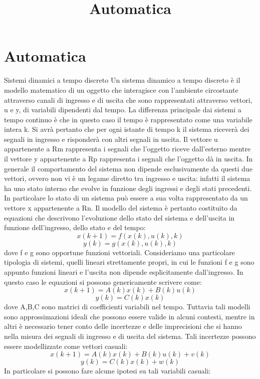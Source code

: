 \documentclass[12pt,a4paper]{article}
\title{Automatica}
\begin{document}
\section{Automatica}
Sistemi dinamici a tempo discreto
Un sistema dinamico a tempo discreto è il modello matematico di un oggetto che interagisce con l’ambiente circostante attraverso canali di ingresso e di uscita che sono rappresentati attraverso vettori, u e y, di variabili dipendenti dal tempo. La differenza principale dai sistemi a tempo continuo è che in questo caso il tempo è rappresentato come una variabile intera k.
Si avrà pertanto che per ogni istante di tempo k il sistema riceverà dei segnali in ingresso e risponderà con altri segnali in uscita.
Il vettore u appartenente a Rm rappresenta i segnali che l’oggetto riceve dall’esterno mentre il vettore y appartenente a Rp rappresenta i segnali che l’oggetto dà in uscita.
In generale il comportamento del sistema non dipende esclusivamente da questi due vettori, ovvero non vi è un legame diretto tra ingresso e uscita: infatti il sistema ha uno stato interno che evolve in funzione degli ingressi e degli stati precedenti. In particolare lo stato di un sistema può essere a sua volta rappresentato da un vettore x appartenente a Rn.
Il modello del sistema è pertanto costituito da equazioni che descrivono l’evoluzione dello stato del sistema e dell’uscita in funzione dell’ingresso, dello stato e del tempo:
\[x(k+1) = f(x(k),u(k),k)\]
\[y(k) = g(x(k),u(k),k)\]
dove f e g sono opportune funzioni vettoriali.
Consideriamo una particolare tipologia di sistemi, quelli lineari strettamente propri, in cui le funzioni f e g sono appunto funzioni lineari e l’uscita non dipende esplicitamente dall’ingresso. In questo caso le equazioni si possono genericamente scrivere come:
\[x(k+1) = A(k)x(k) + B(k)u(k)\]
\[y(k) = C(k)x(k)\]
dove A,B,C sono matrici di coefficienti variabili nel tempo.
Tuttavia tali modelli sono approssimazioni ideali che possono essere valide in alcuni contesti, mentre in altri è necessario tener conto delle incertezze e delle imprecisioni che si hanno nella misura dei segnali di ingresso e di uscita del sistema.
Tali incertezze possono essere modellizzate come vettori casuali:
\[x(k+1) = A(k)x(k) + B(k)u(k) + v(k)\]
\[y(k) = C(k)x(k) + w(k)\]
In particolare si possono fare alcune ipotesi su tali variabili casuali:
\end{document}
